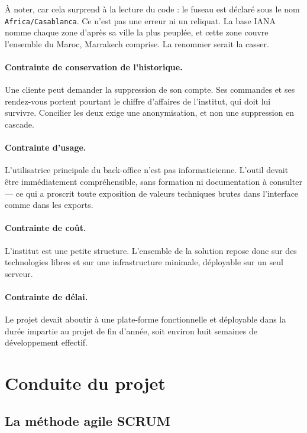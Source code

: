 À noter, car cela surprend à la lecture du code : le fuseau est déclaré sous le
nom \texttt{Africa/Casablanca}. Ce n'est pas une erreur ni un reliquat. La base
IANA nomme chaque zone d'après sa ville la plus peuplée, et cette zone couvre
l'ensemble du Maroc, Marrakech comprise. La renommer serait la casser.

\paragraph{Contrainte de conservation de l'historique.} Une cliente peut
demander la suppression de son compte. Ses commandes et ses rendez-vous
portent pourtant le chiffre d'affaires de l'institut, qui doit lui survivre.
Concilier les deux exige une anonymisation, et non une suppression en cascade.

\paragraph{Contrainte d'usage.} L'utilisatrice principale du back-office n'est
pas informaticienne. L'outil devait être immédiatement compréhensible, sans
formation ni documentation à consulter --- ce qui a proscrit toute exposition
de valeurs techniques brutes dans l'interface comme dans les exports.

\paragraph{Contrainte de coût.} L'institut est une petite structure.
L'ensemble de la solution repose donc sur des technologies libres et sur une
infrastructure minimale, déployable sur un seul serveur.

\paragraph{Contrainte de délai.} Le projet devait aboutir à une plate-forme
fonctionnelle et déployable dans la durée impartie au projet de fin d'année,
soit environ huit semaines de développement effectif.

\section{Conduite du projet}

\subsection{La méthode agile SCRUM}

